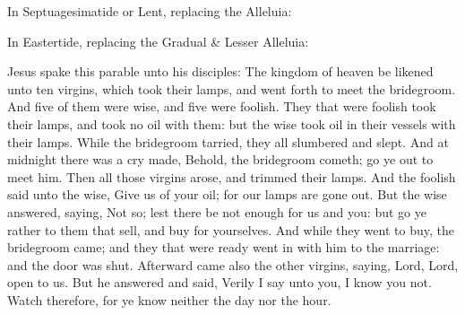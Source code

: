 \begin{rubric}
{In Septuagesimatide or Lent, replacing the Alleluia:}
\end{rubric}

\vspace{-1ex}


\begin{rubric}
{In Eastertide, replacing the Gradual \& Lesser Alleluia:}
\end{rubric}

\vspace{-1ex}


\vspace{-0.25\baselineskip}

\label{CommonVirginMartyrIGospel}

\vspace{-0.1\baselineskip}

 Jesus spake this parable unto his disciples: The kingdom of heaven be likened unto ten virgins, which took their lamps, and went forth to meet the bridegroom. And five of them were wise, and five were foolish. They that were foolish took their lamps, and took no oil with them: but the wise took oil in their vessels with their lamps. While the bridegroom tarried, they all slumbered and slept. And at midnight there was a cry made, Behold, the bridegroom cometh; go ye out to meet him. Then all those virgins arose, and trimmed their lamps. And the foolish said unto the wise, Give us of your oil; for our lamps are gone out. But the wise answered, saying, Not so; lest there be not enough for us and you: but go ye rather to them that sell, and buy for yourselves. And while they went to buy, the bridegroom came; and they that were ready went in with him to the marriage: and the door was shut. Afterward came also the other virgins, saying, Lord, Lord, open to us. But he answered and said, Verily I say unto you, I know you not. Watch therefore, for ye know neither the day nor the hour.

